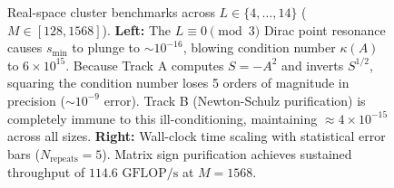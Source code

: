 \begin{figure}[t]
\caption{Real-space cluster benchmarks across $L \in \{4, \dots, 14\}$ ($M \in [128, 1568]$). \textbf{Left:} The $L \equiv 0 \pmod 3$ Dirac point resonance causes $s_{\min}$ to plunge to $\sim 10^{-16}$, blowing condition number $\kappa(A)$ to $6 \times 10^{15}$. Because Track A computes $S = -A^2$ and inverts $S^{1/2}$, squaring the condition number loses 5 orders of magnitude in precision ($\sim 10^{-9}$ error). Track B (Newton-Schulz purification) is completely immune to this ill-conditioning, maintaining $\approx 4 \times 10^{-15}$ across all sizes. \textbf{Right:} Wall-clock time scaling with statistical error bars ($N_{\mathrm{repeats}} = 5$). Matrix sign purification achieves sustained throughput of $114.6\text{ GFLOP/s}$ at $M=1568$.}
\label{fig:f18_dense_real_space_resonance}
\end{figure}
